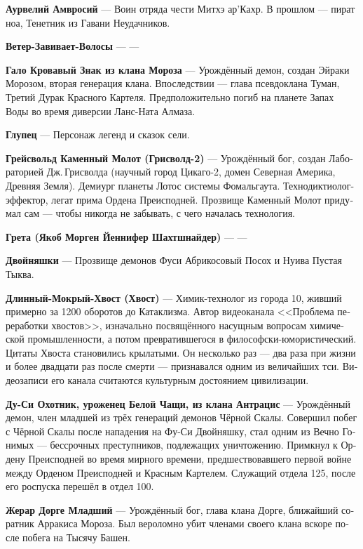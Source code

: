 \documentclass[a4paper,12pt,fleqn]{book}\usepackage{polyglossia}\setdefaultlanguage[babelshorthands=true]{russian}\setotherlanguage{english}\defaultfontfeatures{Ligatures=TeX,Mapping=tex-text}\usepackage{xcolor}\newcommand{\ml}[3]{#2}
\newcommand{\theterm}[3]{\textbf{\hypertarget{#1}{#2}} --- #3}
\begin{document}
{\theterm{aurweli} %
{Аурвелий Амвросий}
{Воин отряда чести Митхэ ар'Кахр.
В прошлом --- пират ноа, Тенетник из Гавани Неудачников.}

\theterm{wind-curling-hair} %
{Ветер-Завивает-Волосы}
{---}

\theterm{jalo}
{Гало Кровавый Знак из клана Мороза}
{Урождённый демон, создан Эйраки Морозом, вторая генерация клана.
Впоследствии --- глава псевдоклана Туман, Третий Дурак Красного Картеля.
Предположительно погиб на планете Запах Воды во время диверсии Ланс-Ната Алмаза.}

\theterm{fool}
{Глупец}
{Персонаж легенд и сказок сели.}

\theterm{grejsvolt} %
{Грейсвольд Каменный Молот (Грисволд-2)}
{Урождённый бог, создан Лабораторией Дж.\,Грисволда (научный город Цикаго-2, домен Северная Америка, Древняя Земля).
Демиург планеты Лотос системы Фомальгаута.
Технодиктиолог-эффектор, легат прима Ордена Преисподней.
Прозвище Каменный Молот придумал сам --- чтобы никогда не забывать, с чего началась технология.}

\theterm{greta}
{Грета (Якоб Морген Йеннифер Шахтшнайдер)}
{---}

\theterm{siblings} %
{Двойняшки}
{Прозвище демонов Фуси Абрикосовый Посох и Нуива Пустая Тыква.}

\theterm{long-moist-tail}
{Длинный-Мокрый-Хвост (Хвост)}
{Химик-технолог из города 10, живший примерно за 1200 оборотов до Катаклизма.
Автор видеоканала <<Проблема переработки хвостов>>, изначально посвящённого насущным вопросам химической промышленности, а потом превратившегося в философски-юмористический.
Цитаты Хвоста становились крылатыми.
Он несколько раз --- два раза при жизни и более двадцати раз после смерти --- признавался одним из величайших тси.
Видеозаписи его канала считаются культурным достоянием цивилизации.}

\theterm{du-xi} %
{Ду-Си Охотник, уроженец Белой Чащи, из клана Антрацис}
{Урождённый демон, член младшей из трёх генераций демонов Чёрной Скалы.
Совершил побег с Чёрной Скалы после нападения на Фу-Си Двойняшку, стал одним из Вечно Гонимых --- бессрочных преступников, подлежащих уничтожению.
Примкнул к Ордену Преисподней во время мирного времени, предшествовавшего первой войне между Орденом Преисподней и Красным Картелем.
Служащий отдела 125, после его роспуска перешёл в отдел 100.}

\theterm{dourgue-junior} %
{Жерар Дорге Младший}
{Урождённый бог, глава клана Дорге, ближайший соратник Арракиса Мороза.
Был вероломно убит членами своего клана вскоре после побега на Тысячу Башен.}

}
\end{document}
